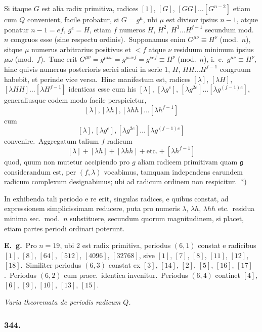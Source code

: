 \documentclass[12pt,a4paper]{article}
\theoremstyle{plain}
\theoremstyle{definition}
\theoremstyle{remark}
\begin{document}
Si itaque $G$ est alia radix primitiva, radices $[1]$, $[G]$, $[GG]\dots[G^{n-2}]$
etiam cum $Q$ convenient, facile probatur, si $G=g^\mu$, ubi $\mu$ est divisor
ipsius $n-1$, atque ponatur $n-1=ef$, $g^e=H$, etiam $f$ numeros
$H$, $H^2$, $H^3\dots H^{f-1}$ secundum mod.\ $n$ congruos esse (sine respectu
ordinis).\ Supponamus enim $G^{\mu\nu}\equiv H^\nu$ (mod.\ $n$), sitque $\mu$ numerus
arbitrarius positivus et $<f$ atque $\nu$ residuum minimum ipsius
$\mu\omega$ (mod.\ $f$).\ Tunc erit $G^{\mu\nu}=g^{\mu\nu\omega}=g^{\mu\omega ef}=g^{\nu ef}\equiv H^\nu$
(mod.\ $n$), i.\ e.\ $g^{\mu\nu}\equiv H^\nu$, hinc quivis numerus posterioris seriei
alicui in serie $1$, $H$, $HH\dots H^{f-1}$ congruum habebit, et perinde vice
versa.\ Hinc manifestum est, radices $[\lambda]$, $[\lambda H]$, $[\lambda HH]\dots[\lambda H^{f-1}]$
identicas esse cum his $[\lambda]$, $[\lambda g^e]$, $[\lambda g^{2e}]\dots[\lambda g^{(f-1)e}]$, generaliusque
eodem modo facile perspicietur,
\[[\lambda], [\lambda h], [\lambda hh]\dots[\lambda h^{f-1}]\]
cum
\[[\lambda], [\lambda g^e], [\lambda g^{2e}]\dots[\lambda g^{(f-1)e}]\]
convenire.\ Aggregatum talium $f$ radicum
\[[\lambda]+[\lambda h]+[\lambda hh]+\text{etc.}+[\lambda h^{f-1}]\]
quod, quum non mutetur accipiendo pro $g$ aliam radicem primitivam
quam $\mathfrak{g}$ considerandum est, per $(f,\lambda)$ vocabimus, tamquam independens
earundem radicum complexum designabimus; ubi ad radicum ordinem non
respicitur.\ *)

In exhibenda tali periodo e re erit, singulas radices, e quibus constat,
ad expressionem simplicissimam reducere, puta pro numeris
$\lambda$, $\lambda h$, $\lambda hh$ etc.\ residua minima sec.\ mod.\ $n$ substituere, secundum
quorum magnitudinem, si placet, etiam partes periodi ordinari poterunt.

\textbf{E.\ g.}\ Pro $n=19$, ubi 2 est radix primitiva, periodus $(6,1)$ constat
e radicibus $[1]$, $[8]$, $[64]$, $[512]$, $[4096]$, $[32768]$, sive $[1]$, $[7]$,
$[8]$, $[11]$, $[12]$, $[18]$.\ Similiter periodus $(6,3)$ constat ex $[3]$,
$[14]$, $[2]$, $[5]$, $[16]$, $[17]$.\ Periodus $(6,2)$ cum praec.\ identica
invenitur.\ Periodus $(6,4)$ continet $[4]$, $[6]$, $[9]$, $[10]$, $[13]$, $[15]$.

\textit{Varia theoremata de periodis radicum $Q$.}

\subsubsection*{344.}
\end{document}
